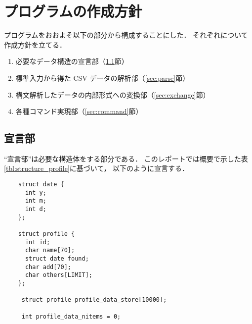 \documentclass[a4j,11pt]{jarticle}
\begin{document}
\section{プログラムの作成方針}


プログラムをおおよそ以下の部分から構成することにした．
それぞれについて作成方針を立てる．

\begin{enumerate}
\setlength{\parskip}{2pt} \setlength{\itemsep}{2pt}
    \item 必要なデータ構造の宣言部（\ref{sec:declare}節）
    \item 標準入力から得た CSV データの解析部（\ref{sec:parse}節）
    \item 構文解析したデータの内部形式への変換部（\ref{sec:exchange}節）
    \item 各種コマンド実現部（\ref{sec:command}節）
\end{enumerate}


\subsection{宣言部} 
\label{sec:declare}

``宣言部''は必要な構造体をする部分である．
このレポートでは概要で示した表\ref{tbl:structure_profile}に基づいて，
以下のように宣言する．

{\fontsize{10pt}{11pt} \selectfont
\begin{verbatim}
    struct date {
      int y;
      int m;
      int d;
    };

    struct profile {
      int id;
      char name[70];
      struct date found;
      char add[70];
      char others[LIMIT];
    };

     struct profile profile_data_store[10000];

     int profile_data_nitems = 0;
\end{verbatim}
}
\end{document}
